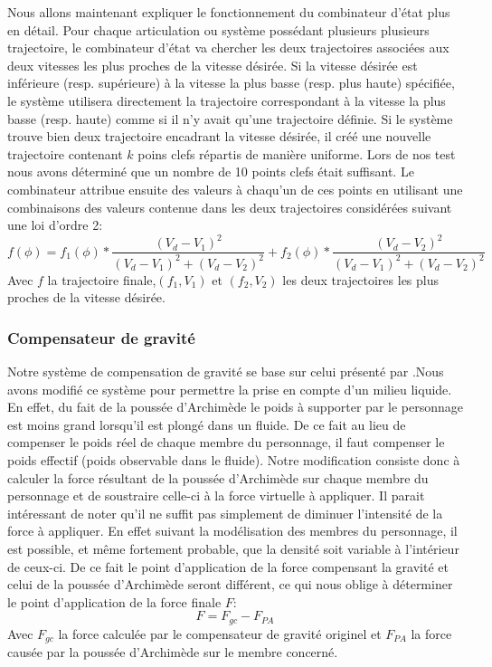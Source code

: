 \documentclass{llncs}
\begin{document}
Nous allons maintenant expliquer le fonctionnement du combinateur d'état plus en détail. Pour chaque articulation ou système possédant plusieurs plusieurs trajectoire, le combinateur d'état va chercher les deux trajectoires associées aux deux vitesses les plus proches de la vitesse désirée. Si la vitesse désirée est inférieure (resp. supérieure) à la vitesse la plus basse (resp. plus haute) spécifiée, le système utilisera directement la trajectoire correspondant à la vitesse la plus basse (resp. haute) comme si il n'y avait qu'une trajectoire définie. Si le système trouve bien deux trajectoire encadrant la vitesse désirée, il créé une nouvelle trajectoire contenant $k$ poins clefs répartis de manière uniforme. Lors de nos test nous avons déterminé que un nombre de 10 points clefs était suffisant. Le combinateur attribue ensuite des valeurs à chaqu'un de ces points en utilisant une combinaisons des valeurs contenue dans les deux trajectoires considérées suivant une loi d'ordre 2:
$$
f(\phi)=f_1(\phi)*\frac{(V_d-V_1)^2}{(V_d-V_1)^2+(V_d-V_2)^2}+f_2(\phi)*\frac{(V_d-V_2)^2}{(V_d-V_1)^2+(V_d-V_2)^2}
$$
Avec $f$ la trajectoire finale,$(f_1,V_1)$ et $(f_2,V_2)$ les deux trajectoires les plus proches de la vitesse désirée.
% 
\subsubsection{Compensateur de gravité}
Notre système de compensation de gravité se base sur celui présenté par \cite{coros2010generalized}.Nous avons modifié ce système pour permettre la prise en compte d'un milieu liquide. En effet, du fait de la poussée d'Archimède le poids à supporter par le personnage est moins grand lorsqu'il est plongé dans un fluide. De ce fait au lieu de compenser le poids réel de chaque membre du personnage, il faut compenser le poids effectif (poids observable dans le fluide). Notre modification consiste donc à calculer la force résultant de la poussée d'Archimède sur chaque membre du personnage et de soustraire celle-ci à la force virtuelle à appliquer. Il parait intéressant de noter qu'il ne suffit pas simplement de diminuer l'intensité de la force à appliquer. En effet suivant la modélisation des membres du personnage, il est possible, et même fortement probable, que la densité soit variable à l'intérieur de ceux-ci. De ce fait le point d'application de la force compensant la gravité et celui de la poussée d'Archimède seront différent, ce qui nous oblige à déterminer le point d'application de la force finale $F$:
$$
F=F_{gc}- F_{PA}
$$
Avec $F_{gc}$ la force calculée par le compensateur de gravité originel et $F_{PA}$ la force causée par la poussée d'Archimède sur le membre concerné.
\end{document}
